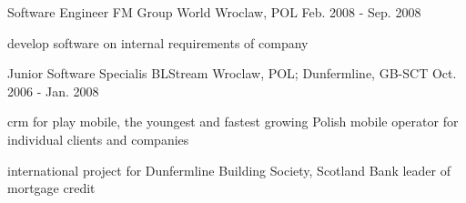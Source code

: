 \begin{cventries}
  \cventry
    {Software Engineer} %
    {FM Group World} %
    {Wroclaw, POL} %
    {Feb. 2008 - Sep. 2008} %
    {
      \begin{cvitems} %
        \item {develop software on internal requirements of company}
      \end{cvitems}
    }

  \cventry
    {Junior Software Specialis} %
    {BLStream} %
    {Wroclaw, POL; Dunfermline, GB-SCT} %
    {Oct. 2006 - Jan. 2008} %
    {
      \begin{cvitems} %
        \item {crm for play mobile, the youngest and fastest growing Polish mobile operator for individual clients and companies}
        \item {international project for Dunfermline Building Society, Scotland Bank leader of mortgage credit}
      \end{cvitems}
    }

\end{cventries}
